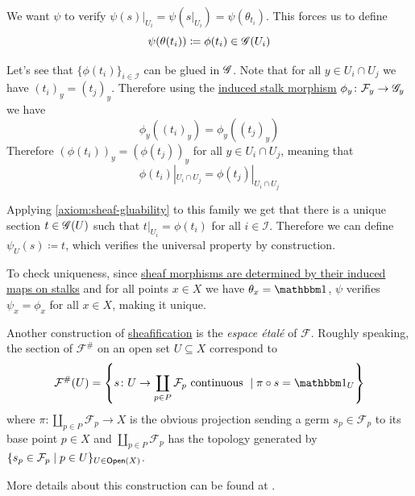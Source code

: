 \documentclass[../../main]{subfiles}
\begin{document}
\begin{construction}
  We want \(\psi\) to verify \(\psi(s)|_{U_{i}} = \psi(s|_{U_{i}}) = \psi(\theta_{t_{i}})\). This forces us to define
  \begin{equation*}
    \psi(\theta(t_{i})) \coloneq \phi(t_{i}) \in \mathscr{G}(U_{i})
  \end{equation*}

  Let's see that \(\{\phi(t_{i})\}_{i \in \mathcal{I}}\) can be glued in \(\mathscr{G}\).
  Note that for all \(y \in U_{i} \cap U_{j}\) we have \((t_{i})_{y} = (t_{j})_{y}\).
  Therefore using the \hyperref[def:stalk]{induced stalk morphism} \(\phi_{y}\colon \mathcal{F}_{y} \to \mathscr{G}_{y}\) we have
  \begin{equation*}
    \phi_{y}((t_{i})_{y}) = \phi_{y}((t_{j})_{y})
  \end{equation*}
  Therefore \((\phi(t_{i}))_{y} = (\phi(t_{j}))_{y}\) for all \(y \in U_{i} \cap U_{j}\), meaning that
  \begin{equation*}
    \phi(t_{i})|_{U_{i} \cap U_{j}} = \phi(t_{j})|_{U_{i} \cap U_{j}}
  \end{equation*}

  Applying \ref{axiom:sheaf-gluability} to this family we get that there is a unique section \(t \in \mathscr{G}(U)\) such that \(t|_{U_{i}} = \phi(t_{i})\) for all \(i \in \mathcal{I}\).
  Therefore we can define \(\psi_{U}(s) \coloneq t\), which verifies the universal property by construction.

  To check uniqueness, since \hyperref[thm:sheaf-morphism-determined-by-stalks]{sheaf morphisms are determined by their induced maps on stalks} and for all points \(x \in X\) we have \(\theta_{x} = \id\), \(\psi\) verifies \(\psi_{x} = \phi_{x}\) for all \(x \in X\), making it unique.
\end{construction}

\begin{remark}
  Another construction of \hyperref[def:sheafification]{sheafification} is the \textit{espace étalé} of \(\mathcal{F}\).
  Roughly speaking, the section of \(\mathcal{F}^{\#}\) on an open set \(U \subseteq X\) correspond to
  \begin{equation*}
    \mathcal{F}^{\#}(U) = \left\{ s\colon U \to \coprod_{p \in P} \mathcal{F}_{p} \text{ continuous } \mid \pi \circ s = \id_{U} \right\}
  \end{equation*}
  where \(\pi\colon \coprod_{p \in P} \mathcal{F}_{p} \to X\) is the obvious projection sending a germ \(s_{p} \in \mathcal{F}_{p}\) to its base point \(p \in X\) and \(\coprod_{p \in P} \mathcal{F}_{p}\) has the topology generated by \(\{s_{p} \in \mathcal{F}_{p} \mid p \in U\}_{U \in \mathsf{Open}(X)}\).

  More details about this construction can be found at \cite{vakilRISINGSEAFoundations2025}.
\end{remark}
\end{document}
